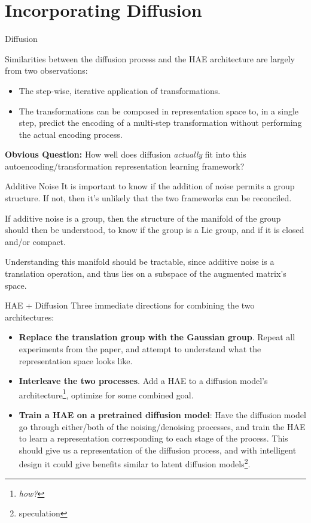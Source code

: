 \documentclass{beamer}
\begin{document}
  \section{Incorporating Diffusion}
  \begin{frame}{Diffusion}
    
    Similarities between the diffusion process and the HAE architecture are largely from two observations:
    \begin{itemize}
      \item The step-wise, iterative application of transformations.
      \item The transformations can be composed in representation space to, in a single step, predict the encoding of a multi-step transformation without performing the actual encoding process.
    \end{itemize}
    \textbf{Obvious Question:} How well does diffusion \textit{actually} fit into this autoencoding/transformation representation learning framework?
  \end{frame}
  \begin{frame}{Additive Noise}
    It is important to know if the addition of noise permits a group structure. If not, then it's unlikely that the two frameworks can be reconciled.

    If additive noise is a group, then the structure of the manifold of the group should then be understood, to know if the group is a Lie group, and if it is closed and/or compact.

    Understanding this manifold should be tractable, since additive noise is a translation operation, and thus lies on a subspace of the augmented matrix's space.

  \end{frame}
  \begin{frame}{HAE + Diffusion}
    Three immediate directions for combining the two architectures:
    \begin{itemize}
      \item \textbf{Replace the translation group with the Gaussian group}. Repeat all experiments from the paper, and attempt to understand what the representation space looks like.
      \item \textbf{Interleave the two processes}. Add a HAE to a diffusion model's architecture\footnote{\textit{how?}}, optimize for some combined goal.
      \item \textbf{Train a HAE on a pretrained diffusion model}: Have the diffusion model go through either/both of the noising/denoising processes, and train the HAE to learn a representation corresponding to each stage of the process. This should give us a representation of the diffusion process, and with intelligent design it could give benefits similar to latent diffusion models\footnote{speculation}.
    \end{itemize}
  \end{frame}
\end{document}

